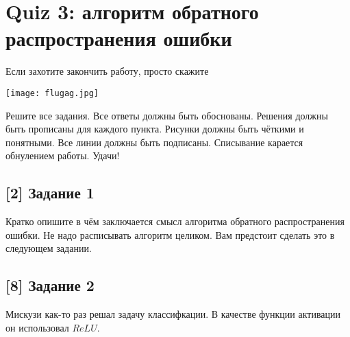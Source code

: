 \documentclass[12pt, a4paper, oneside]{article}
\begin{document}
\section*{Quiz 3: алгоритм обратного распространения ошибки}

\epigraph{Если захотите закончить работу, просто скажите \begin{center} \texttt{[image: flugag.jpg]} \end{center}}{}

\vspace{-0.9cm}

Решите все задания. Все ответы должны быть обоснованы. Решения должны быть прописаны для каждого пункта. Рисунки должны быть чёткими и понятными. Все линии должны быть подписаны. Списывание карается обнулением работы.  Удачи! 

\vspace{-0.5cm}
\subsection*{[2] Задание 1}
\vspace{-0.5cm}

Кратко опишите в чём заключается смысл алгоритма обратного распространения ошибки. Не надо расписывать алгоритм целиком. Вам предстоит сделать это в следующем задании.

\vspace{-0.5cm}
\subsection*{[8] Задание 2}
\vspace{-0.5cm}

Мискузи как-то раз решал задачу классифкации. В качестве функции активации он использовал $ReLU$.
\end{document}
